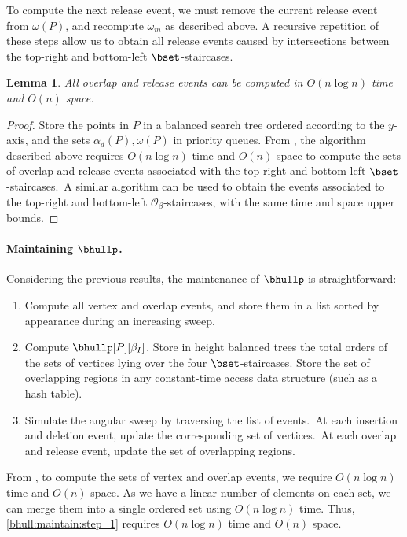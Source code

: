 \documentclass[11pt,letterpaper,english]{article}
\newtheorem{lemma}{Lemma}
\theoremstyle{definition}
\begin{document}
To compute the next release event, we must remove the current release
event from $\omega(P)$, and recompute $\omega_m$ as described above. A
recursive repetition of these steps allow us to obtain all release
events caused by intersections between the top-right and bottom-left
$\bset$-staircases.

\begin{lemma}\label{bhull:lemma:overlap_events}
  All overlap and release events can be computed in $O(n \log n)$ time
  and $O(n)$ space.
\end{lemma}
\begin{proof}
  Store the points in $P$ in a balanced search tree ordered according
  to the $y$-axis, and the sets $\alpha_d(P),\omega(P)$ in priority
  queues. From , the algorithm
  described above requires $O(n \log n)$ time and $O(n)$ space to
  compute the sets of overlap and release events associated with the
  top-right and bottom-left $\bset$-staircases.~A similar algorithm
  can be used to obtain the events associated to the top-right and
  bottom-left $\mathcal{O}_{\beta}$-staircases, with the same time and
  space upper bounds.
\end{proof}

\paragraph{Maintaining $\bhullp$.}

Considering the previous results, the maintenance of $\bhullp$ is
straightforward:
\begin{enumerate}
\item \label{bhull:maintain:step_1} Compute all vertex and overlap
  events, and store them in a list sorted by appearance during an
  increasing sweep.
\item \label{bhull:maintain:step_2} Compute
  $\bhullp[P][\beta_I]$. Store in height balanced trees the total
  orders of the sets of vertices lying over the four
  $\bset$-staircases. Store the set of overlapping regions in any
  constant-time access data structure (such as a hash table).
\item \label{bhull:maintain:step_3} Simulate the angular sweep by
  traversing the list of events.~At each insertion and deletion event,
  update the corresponding set of vertices.~At each overlap and
  release event, update the set of overlapping regions.
\end{enumerate}

From , to
compute the sets of vertex and overlap events, we require
$O(n \log n)$ time and $O(n)$ space.
As we have a linear number of elements on each set,
we can merge them into a single ordered set using
$O(n \log n)$ time. Thus,
\cref{bhull:maintain:step_1} requires $O(n \log n)$ time and $O(n)$
space.
\end{document}
